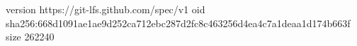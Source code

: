 version https://git-lfs.github.com/spec/v1
oid sha256:668d1091ae1ae9d252ca712ebc287d2fc8c463256d4ea4c7a1deaa1d174b663f
size 262240
